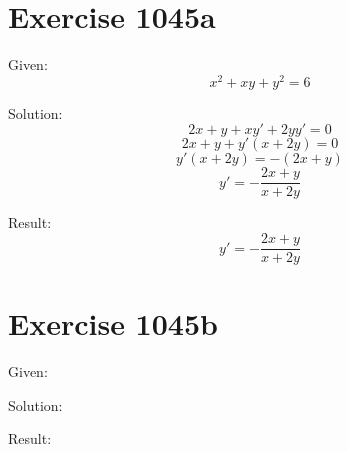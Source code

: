 \documentclass[a4paper, 10pt]{scrartcl}
\begin{document}
\section{Exercise 1045a}

Given:
\[
x^{2} + xy + y^{2} = 6
\]

Solution:
\[
2x + y + xy' + 2yy' = 0
\]
\[
2x + y + y'(x + 2y) = 0
\]
\[
y'(x + 2y) = -(2x + y)
\]
\[
y' = -\frac{2x + y}{x + 2y}
\]

Result:
\[
y' = -\frac{2x + y}{x + 2y}
\]

\section{Exercise 1045b}

Given:
\[
\]

Solution:

Result:
\end{document}

